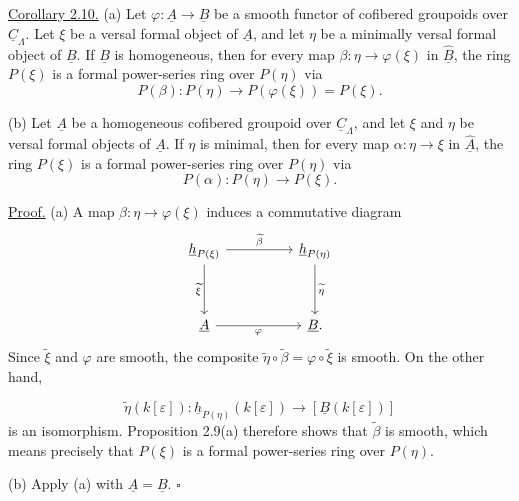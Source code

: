 \underline{Corollary 2.10.} (a) Let
$\varphi:\underline A\longrightarrow\underline B$ be a smooth functor
of cofibered groupoids over $\underline C_\Lambda$. Let $\xi$ be a
versal formal object of $\underline A$, and let $\eta$ be a minimally
versal formal object of $\underline B$. If $\underline B$ is
homogeneous, then for every map
$\beta:\eta\longrightarrow\varphi(\xi)$ in
$\widehat{\underline B}$, the ring $P(\xi)$ is a formal power-series
ring over $P(\eta)$ via
\[
 P(\beta):P(\eta)\longrightarrow P(\varphi(\xi))=P(\xi).
\]

(b) Let $\underline A$ be a homogeneous cofibered groupoid over
$\underline C_\Lambda$, and let $\xi$ and $\eta$ be versal formal
objects of $\underline A$. If $\eta$ is minimal, then for every map
$\alpha:\eta\longrightarrow\xi$ in $\widehat{\underline A}$, the
ring $P(\xi)$ is a formal power-series ring over $P(\eta)$ via
\[
 P(\alpha):P(\eta)\longrightarrow P(\xi).
\]

\underline{Proof.} (a) A map
$\beta:\eta\longrightarrow\varphi(\xi)$ induces a commutative
diagram
\[
\begin{tikzcd}[row sep=huge,column sep=huge]
 \underline h_{P(\xi)} \arrow[r,"{\widetilde\beta}"]
                           \arrow[d,"{\widetilde\xi}"']
 & \underline h_{P(\eta)} \arrow[d,"{\widetilde\eta}"]\\
 \underline A \arrow[r,"{\varphi}"'] & \underline B.
\end{tikzcd}
\]
Since $\widetilde\xi$ and $\varphi$ are smooth, the composite
$\widetilde\eta\circ\widetilde\beta
=\varphi\circ\widetilde\xi$ is smooth. On the other hand,


\[
 \widetilde\eta(k[\varepsilon]):
 \underline h_{P(\eta)}(k[\varepsilon])
 \longrightarrow[\underline B(k[\varepsilon])]
\]
is an isomorphism. Proposition 2.9(a) therefore shows that
$\widetilde\beta$ is smooth, which means precisely that $P(\xi)$ is
a formal power-series ring over $P(\eta)$.

(b) Apply (a) with $\underline A=\underline B$. \hfill$\square$
